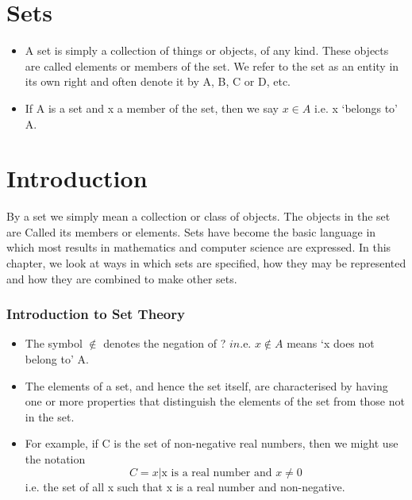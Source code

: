 %
%
\section{Sets}
\smallskip   %
\begin{itemize}
\item A set is simply a collection of things or objects, of any kind. These objects
are called elements or members of the set. We refer to the set as an
entity in its own right and often denote it by A, B, C or D, etc.
\item If A is a set and x a member of the set, then we say $x \in A$ i.e. x ‘belongs to’
A. 
\end{itemize}
\smallskip 
\section{Introduction} %
\smallskip 
By a set we simply mean a collection or class of objects. The objects in the set are Called its
members or elements. Sets have become the basic language in which most results in mathematics
and computer science are expressed. 
In this chapter, we look at ways in which sets are speciﬁed,
how they may be represented and how they are combined to make other sets.
\smallskip 
\smallskip 
\frametitle{Introduction to Set Theory}
\begin{itemize}
\item The symbol $\notin$ denotes the negation of ? $in$.e. $x \notin A$ means ‘x does not
belong to’ A.
\item The elements of a set, and hence the set itself, are characterised by having
one or more properties that distinguish the elements of the set from those
not in the set.
\item For example, if C is the set of non-negative real numbers, then we
might use the notation
\[C = {x | \mbox{x is a real number and }x \neq 0}\]
i.e. the set of all x such that x is a real number and non-negative.
\end{itemize}
\smallskip 

